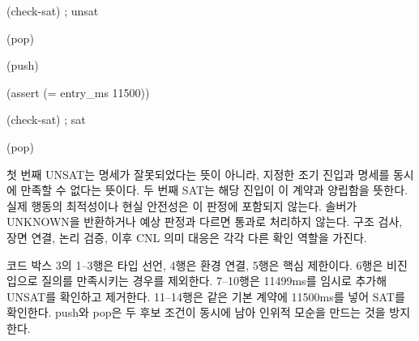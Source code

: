 \documentclass[10pt,a4paper,twocolumn]{article}\usepackage[margin=18mm]{geometry}\usepackage{fontspec,kotex}
\begin{document}
{\begin{minipage}{\dimexpr\linewidth-2\fboxsep-2\fboxrule\relax}
\noindent{}\hspace{.4em}\parbox[t]{\dimexpr\linewidth-2em\relax}{\raggedright\ttfamily{}\fontsize{7.2}{9}\selectfont \hspace*{0.0em}(check-sat) ; unsat\strut}\par
\noindent{}\hspace{.4em}\parbox[t]{\dimexpr\linewidth-2em\relax}{\raggedright\ttfamily{}\fontsize{7.2}{9}\selectfont \hspace*{0.0em}(pop)\strut}\par
\noindent{}\hspace{.4em}\parbox[t]{\dimexpr\linewidth-2em\relax}{\raggedright\ttfamily{}\fontsize{7.2}{9}\selectfont \hspace*{0.0em}(push)\strut}\par
\noindent{}\hspace{.4em}\parbox[t]{\dimexpr\linewidth-2em\relax}{\raggedright\ttfamily{}\fontsize{7.2}{9}\selectfont \hspace*{0.0em}(assert (= entry\_\allowbreak ms 11500))\strut}\par
\noindent{}\hspace{.4em}\parbox[t]{\dimexpr\linewidth-2em\relax}{\raggedright\ttfamily{}\fontsize{7.2}{9}\selectfont \hspace*{0.0em}(check-sat) ; sat\strut}\par
\noindent{}\hspace{.4em}\parbox[t]{\dimexpr\linewidth-2em\relax}{\raggedright\ttfamily{}\fontsize{7.2}{9}\selectfont \hspace*{0.0em}(pop)\strut}\par
\end{minipage}}\par\smallskip

첫 번째 UNSAT는 명세가 잘못되었다는 뜻이 아니라, 지정한 조기 진입과 명세를 동시에 만족할 수 없다는 뜻이다. 두 번째 SAT는 해당 진입이 이 계약과 양립함을 뜻한다. 실제 행동의 최적성이나 현실 안전성은 이 판정에 포함되지 않는다. 솔버가 UNKNOWN을 반환하거나 예상 판정과 다르면 통과로 처리하지 않는다. 구조 검사, 장면 연결, 논리 검증, 이후 CNL 의미 대응은 각각 다른 확인 역할을 가진다.\par

코드 박스 3의 1--3행은 타입 선언, 4행은 환경 연결, 5행은 핵심 제한이다. 6행은 비진입으로 질의를 만족시키는 경우를 제외한다. 7--10행은 11499ms를 임시로 추가해 UNSAT를 확인하고 제거한다. 11--14행은 같은 기본 계약에 11500ms를 넣어 SAT를 확인한다. {\ttfamily{}\selectfont\footnotesize push}와 {\ttfamily{}\selectfont\footnotesize pop}은 두 후보 조건이 동시에 남아 인위적 모순을 만드는 것을 방지한다.\par
\end{document}
